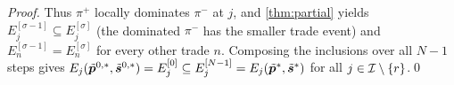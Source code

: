 \begin{proof}
Thus $\pi^+$ locally dominates $\pi^-$ at $j$, and \cref{thm:partial} yields $E^{[\sigma-1]}_j \subseteq E^{[\sigma]}_j$ (the dominated $\pi^-$ has the smaller trade event) and $E^{[\sigma-1]}_{n} = E^{[\sigma]}_{n}$ for every other trade $n$.
Composing the inclusions over all $N-1$ steps gives $E_j(\tilde{{\bm{p}}}^{0,*}, \tilde{{\bm{s}}}^{0,*}) = E^{[0]}_j \subseteq E^{[N-1]}_j = E_j(\tilde{{\bm{p}}}^*, \tilde{{\bm{s}}}^*)$ for all $j \in \mathcal{I} \setminus \{r\}$.\qed
\end{proof}
